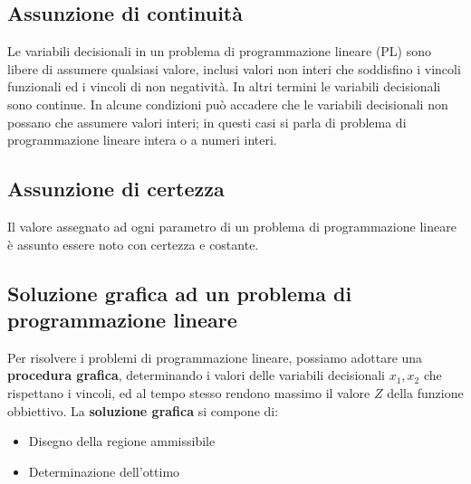 \documentclass[12pt]{article}
\begin{document}
\subsection{Assunzione di continuità}
Le variabili decisionali in un problema di programmazione lineare (PL) sono libere di assumere qualsiasi valore, inclusi valori non interi che soddisfino i vincoli funzionali ed i vincoli di non negatività.
In altri termini le variabili decisionali sono continue.
In alcune condizioni può accadere che le variabili decisionali non possano che assumere valori interi; in questi casi si parla di problema di programmazione lineare intera o a numeri interi.
\subsection{Assunzione di certezza}
Il valore assegnato ad ogni parametro di un problema di programmazione lineare è assunto essere noto con certezza e costante.
\subsection{Soluzione grafica ad un problema di programmazione lineare}
Per risolvere i problemi di programmazione lineare, possiamo adottare una \textbf{procedura grafica}, determinando i valori delle variabili decisionali
$x_1, x_2$ che rispettano i vincoli, ed al tempo stesso rendono massimo il valore $Z$ della funzione obbiettivo.
La \textbf{soluzione grafica} si compone di:
\begin{itemize}
    \item Disegno della regione ammissibile
    \item Determinazione dell'ottimo
\end{itemize}
\end{document}
